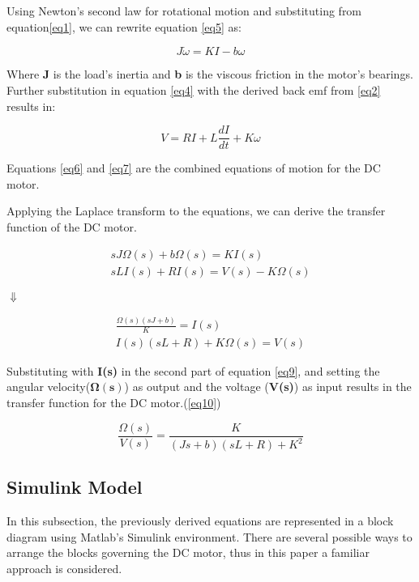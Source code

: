 Using Newton's second law for rotational motion and substituting from equation\ref{eq1}, we can rewrite equation \ref{eq5} as:

\begin{equation} \label{eq6}
J\dot{\omega} = KI - b\omega
\end{equation}

Where \textbf{J} is the load's inertia and \textbf{b} is the viscous friction in the motor's bearings.
Further substitution in equation \ref{eq4} with the derived back emf from \ref{eq2} results in:

\begin{equation} \label{eq7}
V = RI + L\frac{dI}{dt} + K\omega
\end{equation}

Equations \ref{eq6} and \ref{eq7} are the combined equations of motion for the DC motor.

Applying the Laplace transform to the equations, we can derive the transfer function of the DC motor.

\begin{align}  
sJ\Omega(s) + b\Omega(s) = KI(s) \label{eq8}\\
sLI(s) + RI(s) = V(s) - K\Omega(s) \nonumber
\end{align}

\begin{center}
$\Downarrow$
\end{center}

\begin{align} 
\frac{\Omega(s)(sJ + b)}{K} = I(s) \label{eq9} \\
I(s)(sL + R) + K\Omega(s) = V(s)  \nonumber 
\end{align}

Substituting with \textbf{I(s)} in the second part of equation \ref{eq9}, and setting the angular velocity($\boldsymbol{\Omega(s)}$) as output and the voltage (\textbf{V(s)}) as input results in the transfer function for the DC motor.(\ref{eq10})

\begin{equation} \label{eq10}
\frac{\Omega(s)}{V(s)} = \frac{K}{(Js + b)(sL + R) + K^2}
\end{equation}

\subsection{Simulink Model} 

In this subsection, the previously derived equations are represented in a block diagram using Matlab's Simulink environment. There are several possible ways to arrange the blocks governing the DC motor, thus in this paper a familiar approach is considered.

